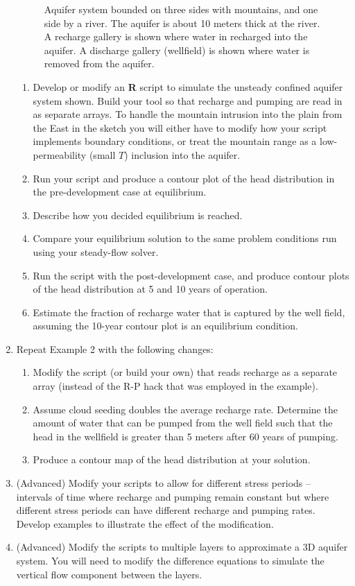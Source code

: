 \begin{enumerate}
\begin{figure}[h!]
   \caption{Aquifer system bounded on three sides with mountains, and one side by a river.  The aquifer is about 10 meters thick at the river.  A recharge gallery is shown where water in recharged into the aquifer.  A discharge gallery (wellfield) is shown where water is removed from the aquifer.}
   \label{fig:ES1-2}
\end{figure}
\begin{enumerate}
\item Develop or modify an  \textbf{R} script to simulate the unsteady confined aquifer system shown.  
Build your tool so that recharge and pumping are read in as separate arrays.
To handle the mountain intrusion into the plain from the East in the sketch you will either have to modify how your script implements boundary conditions, or treat the mountain range as a low-permeability (small $T$) inclusion into the aquifer.
\item Run your script and produce a contour plot of the head distribution in the pre-development case at equilibrium.
\item Describe how you decided equilibrium is reached.
\item Compare your equilibrium solution to the same problem conditions run using your steady-flow solver.  
\item Run the script with the post-development case, and produce contour plots of the head distribution at 5 and 10 years of operation.
\item Estimate the fraction of recharge water that is captured by the well field, assuming the 10-year contour plot is an equilibrium condition.
\end{enumerate}

\item Repeat Example 2 with the following changes:
\begin{enumerate}
\item Modify the script (or build your own) that reads recharge as a separate array (instead of the R-P hack that was employed in the example).
\item Assume cloud seeding doubles the average recharge rate.  Determine the amount of water that can be pumped from the well field such that the head in the wellfield is greater than 5 meters after 60 years of pumping.
\item Produce a contour map of the head distribution at your solution.
\end{enumerate}

\item (Advanced) Modify your scripts to allow for different stress periods -- intervals of time where recharge and pumping remain constant but where different stress periods can have different recharge and pumping rates.  Develop examples to illustrate the effect of the modification.
\item (Advanced) Modify the scripts to multiple layers to approximate a 3D aquifer system.   You will need to modify the difference equations to simulate the vertical flow component between the layers.
\end{enumerate}
